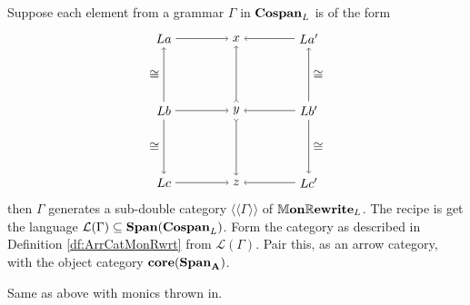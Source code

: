 \documentclass[master]{subfiles}
\begin{document}
\begin{thm}
	Suppose each element from a grammar $ \Gamma $ in $ \mathbf{Cospan}_{L} $ is of the form 
	\[
	\begin{tikzpicture}
	\node (a) at (-1,1) {$ L a $};
	\node (x) at (1,1) {$ x $};
	\node (a') at (3,1) {$ L a' $};
	\node (b) at (-1,-1) {$ L b $};
	\node (y) at (1,-1) {$ y $};
	\node (b') at (3,-1) {$ L b' $};
	\node (c) at (-1,-3) {$ L c $};
	\node (z) at (1,-3) {$ z $};
	\node (c') at (3,-3) {$ L c' $};
	\draw [->] (a) to (x);
	\draw [->] (a') to (x);
	\draw [->] (b) to (y);
	\draw [->] (b') to (y);
	\draw [->] (c) to (z);
	\draw [->] (c') to (z);
	\draw [->] (b) to node [left] {$ \cong $} (a);
	\draw [->] (b) to node [left] {$ \cong $} (c);
	\draw [>->] (y) to (x);
	\draw [>->] (y) to (z);
	\draw [->] (b') to node [right] {$ \cong $} (a');
	\draw [->] (b') to node [right] {$ \cong $} (c');
	\end{tikzpicture}
	\]
	then $ \Gamma $ generates a sub-double category $ \langle \langle \Gamma \rangle \rangle $ of $ \mathbb{M}\mathbf{on}\mathbb{R}\mathbf{ewrite}_{L} $.  The recipe is get the language $ \mathcal{L}(\Gamma)  \subseteq \mathbf{Span} {(\mathbf{Cospan}_{L})} $. Form the category as described in Definition \ref{df:ArrCatMonRwrt} from $ \mathcal{L}(\Gamma) $. Pair this, as an arrow category, with the object category $ \mathbf{core} (\mathbf{Span}_{\mathbf{A}}) $.
\end{thm}

\begin{thm}
	Same as above with monics thrown in.
\end{thm}
\end{document}
